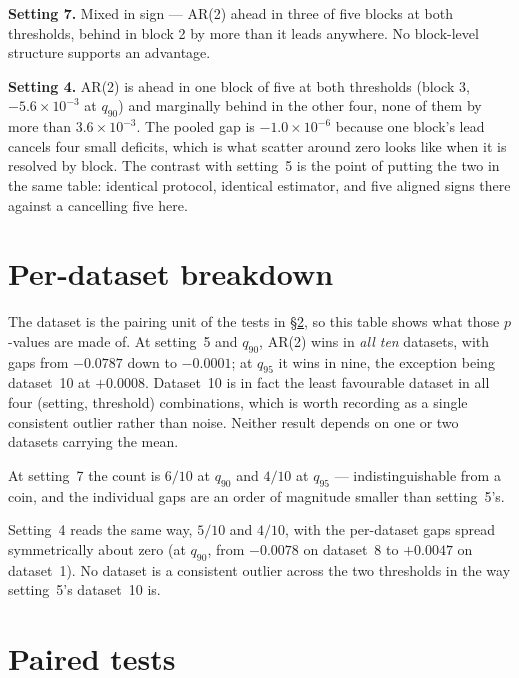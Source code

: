 \documentclass[11pt]{article}
\newcommand{\tblpath}{../../code/analysis/time_block_forecast/simstudy/output/tables}
\newcommand{\tbl}[1]{}
\begin{document}
\noindent\textbf{Setting 7.} Mixed in sign --- AR(2) ahead in three of
five blocks at both thresholds, behind in block 2 by more than it leads
anywhere. No block-level structure supports an advantage.

\noindent\textbf{Setting 4.} AR(2) is ahead in one block of five at both
thresholds (block 3, $-5.6 \times 10^{-3}$ at $q_{90}$) and marginally
behind in the other four, none of them by more than $3.6 \times 10^{-3}$.
The pooled gap is $-1.0 \times 10^{-6}$ because one block's lead cancels
four small deficits, which is what scatter around zero looks like when it
is resolved by block. The contrast with setting~5 is the point of putting
the two in the same table: identical protocol, identical estimator, and
five aligned signs there against a cancelling five here.

\section{Per-dataset breakdown}
\label{sec:dataset}

\tbl{expA_dataset_full}

\noindent The dataset is the pairing unit of the tests in
\S\ref{sec:tests}, so this table shows what those $p$-values are made of.
At setting~5 and $q_{90}$, AR(2) wins in \emph{all ten} datasets, with
gaps from $-0.0787$ down to $-0.0001$; at $q_{95}$ it wins in nine, the
exception being dataset~10 at $+0.0008$. Dataset~10 is in fact the least
favourable dataset in all four (setting, threshold) combinations, which
is worth recording as a single consistent outlier rather than noise.
Neither result depends on one or two datasets carrying the mean.

At setting~7 the count is $6/10$ at $q_{90}$ and $4/10$ at $q_{95}$ ---
indistinguishable from a coin, and the individual gaps are an order of
magnitude smaller than setting~5's.

Setting~4 reads the same way, $5/10$ and $4/10$, with the per-dataset
gaps spread symmetrically about zero (at $q_{90}$, from $-0.0078$ on
dataset~8 to $+0.0047$ on dataset~1). No dataset is a consistent outlier
across the two thresholds in the way setting~5's dataset~10 is.

\section{Paired tests}
\label{sec:tests}

\tbl{expA_tests_full}
\end{document}
